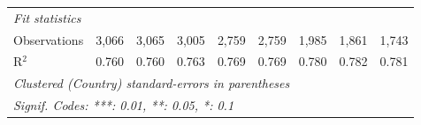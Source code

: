 \begin{tabular}{lcccccccc}
   \midrule \emph{Fit statistics}\\
   Observations                                                       & 3,066   & 3,065   & 3,005   & 2,759       & 2,759       & 1,985          & 1,861          & 1,743\\  
   R$^2$                                                              & 0.760   & 0.760   & 0.763   & 0.769       & 0.769       & 0.780          & 0.782          & 0.781\\  
   \midrule
   \multicolumn{9}{l}{\emph{Clustered (Country) standard-errors in parentheses}}\\
   \multicolumn{9}{l}{\emph{Signif. Codes: ***: 0.01, **: 0.05, *: 0.1}}\\
\end{tabular}
\par\endgroup


